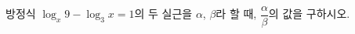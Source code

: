 방정식 $\log_x 9-\log_3 x=1$의 두 실근을 $\alpha$, $\beta$라 할 때, $\dfrac{\alpha}{\beta}$의 값을 구하시오. \cond{$\alpha>\beta$}

